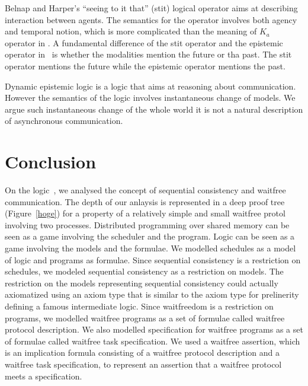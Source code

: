  Belnap and Harper's ``seeing to it that'' (stit) logical operator
 aims at describing interaction between agents.
 The semantics for the operator involves both agency and temporal notion, which is more
 complicated than the meaning of $K_a$ operator in \iec.
 A fundamental difference of the stit operator and the epistemic operator in \iec\,
 is whether the modalities mention the future or tha past.
 The stit operator mentions the future while the epistemic operator mentions the past.

 Dynamic epistemic logic is a logic that aims at reasoning about communication.
 However the semantics of the logic involves
 instantaneous change of models.
 We argue such instantaneous change of the whole world it is
 not a natural description of asynchronous communication.


 \section{Conclusion}
 \label{conclusion}


 On the logic~\iec, we analysed the concept of sequential consistency and waitfree
 communication.
 The depth of our anlaysis is represented in a deep proof tree (Figure~\ref{hoge}) for a
 property of a relatively simple and small waitfree protol involving two processes.
 Distributed programming over shared memory can be seen as a game involving the scheduler
 and the program.
 Logic can be seen as a game involving the models and the formulae.
 We modelled schedules as a model of logic and programs as formulae.
 Since sequential consistency is a restriction on schedules,
 we modeled sequential consistency as a restriction on models.
 The restriction on the models representing sequential consistency could actually
 axiomatized using an axiom type that is similar to the axiom type for prelinerity defining
 a famous intermediate logic.
 Since waitfreedom is a restriction on programs,
 we modelled waitfree programs as a set of formulae called waitfree protocol description.
 We also modelled specification for waitfree programs as a set of formulae called waitfree
 task specification.
 We used a waitfree assertion, which is
 an implication formula consisting of a waitfree protocol description and a
 waitfree task specification,
 to represent
 an assertion that a waitfree protocol meets a specification.
